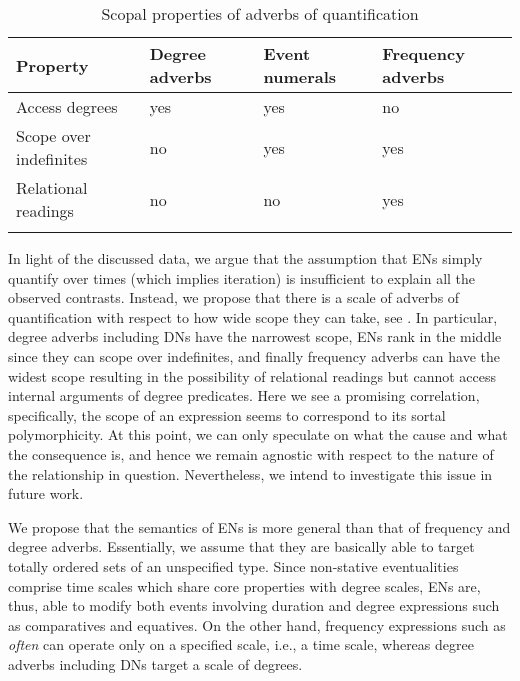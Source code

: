 \documentclass[output=paper,
modfonts,
hidelinks,
newtxmath
]{langscibook}
\begin{document}
\z

\z

\begin{table}[b]
\caption{Scopal properties of adverbs of quantification}\label{table:scale}
\begin{tabularx}{\textwidth}{@{}llll@{}}
\lsptoprule
Property & Degree adverbs & Event numerals & Frequency adverbs\tabularnewline
\midrule
Access degrees & yes & yes & no\tabularnewline
Scope over indefinites & no & yes & yes\tabularnewline
Relational readings & no & no & yes\tabularnewline
\lspbottomrule
\end{tabularx}
\end{table}

\noindent In light of the discussed data, we argue that the assumption that ENs simply quantify over times (which implies iteration) is insufficient to explain all the observed contrasts. Instead, we propose that there is a scale of adverbs of quantification with respect to how wide scope they can take, see . In particular, degree adverbs including DNs have the narrowest scope, ENs rank in the middle since they can scope over indefinites, and finally frequency adverbs can have the widest scope resulting in the possibility of relational readings but cannot access internal arguments of degree predicates. Here we see a promising correlation, specifically, the scope of an expression seems to correspond to its sortal polymorphicity. At this point, we can only speculate on what the cause and what the consequence is, and hence we remain agnostic with respect to the nature of the relationship in question. Nevertheless, we intend to investigate this issue in future work.


We propose that the semantics of ENs is more general than that of frequency and degree adverbs. Essentially, we assume that they are basically able to target totally ordered sets of an unspecified type. Since non-stative eventualities comprise time scales which share core properties with degree scales, ENs are, thus, able to modify both events involving duration and degree expressions such as comparatives and equatives. On the other hand, frequency expressions such as \textit{often} can operate only on a specified scale, i.e., a time scale, whereas degree adverbs including DNs target a scale of degrees.
\end{document}
